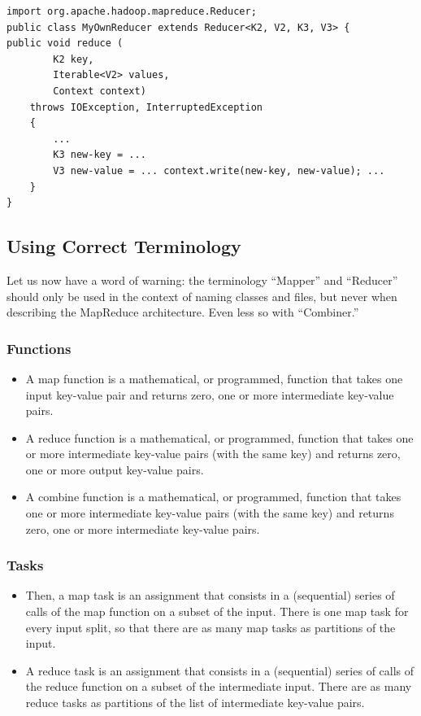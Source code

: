 \begin{lstlisting}[style=Java]
import org.apache.hadoop.mapreduce.Reducer;
public class MyOwnReducer extends Reducer<K2, V2, K3, V3> {
public void reduce (
        K2 key,
        Iterable<V2> values,
        Context context)
    throws IOException, InterruptedException
    {
        ...
        K3 new-key = ...
        V3 new-value = ... context.write(new-key, new-value); ...
    }
}
\end{lstlisting}

\subsection{Using Correct Terminology}

Let us now have a word of warning: the terminology “Mapper” and “Reducer” should only be used in the context of naming classes and files, but never when describing the MapReduce architecture. Even less so with “Combiner.”

\subsubsection{Functions}

\begin{itemize}
    \item A map function is a mathematical, or programmed, function that takes one input key-value pair and returns zero, one or more intermediate key-value pairs.
    \item A reduce function is a mathematical, or programmed, function that takes one or more intermediate key-value pairs (with the same key) and returns zero, one or more output key-value pairs.
    \item A combine function is a mathematical, or programmed, function that takes one or more intermediate key-value pairs (with the same key) and returns zero, one or more intermediate key-value pairs.
\end{itemize}

\subsubsection{Tasks}

\begin{itemize}
    \item Then, a map task is an assignment that consists in a (sequential) series of calls of the map function on a subset of the input. There is one map task for every input split, so that there are as many map tasks as partitions of the input.
    \item A reduce task is an assignment that consists in a (sequential) series of calls of the reduce function on a subset of the intermediate input. There are as many reduce tasks as partitions of the list of intermediate key-value pairs.
\end{itemize}

